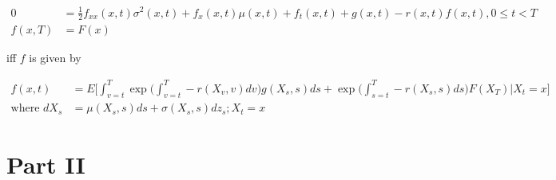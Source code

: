 \documentclass{article}
\begin{document}
\begin{itemize}
\begin{align*}
0 &= \frac{1}{2} f_{xx} (x, t) \sigma^2(x, t) + f_x(x, t) \mu(x, t) + f_t(x, t) + g(x, t) - r(x, t) f(x, t), 0 \le t < T\\
f(x, T) &= F(x)
\end{align*}

iff $f$ is given by

\begin{align*}
f(x, t) &= E\Bigg[ \int_{v=t}^T \exp \Bigg(\int_{v=t}^T -r(X_v, v) dv \Bigg) g(X_s, s) ds + \exp\Bigg(\int_{s=t}^T -r(X_s, s) ds \Bigg) F(X_T) \Bigg| X_t = x \Bigg] \\
\text{where } dX_s &= \mu (X_s, s) ds + \sigma(X_s, s) dz_s; X_t = x
\end{align*}

\end{itemize}

\section{Part II}
\end{document}
